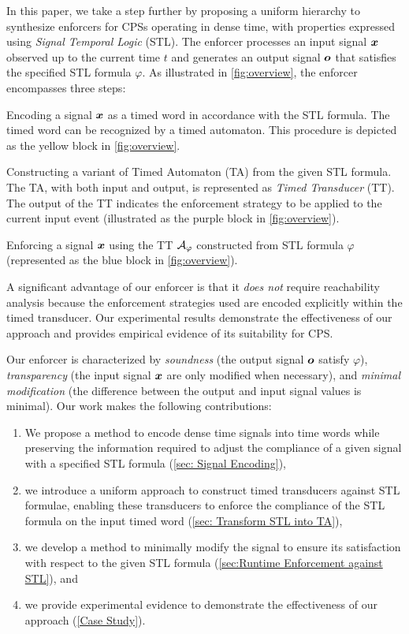 In this paper, we take a step further by proposing a uniform hierarchy to synthesize enforcers for CPSs operating in dense time, with properties expressed using \emph{Signal Temporal Logic} (STL). The enforcer processes an input signal $\bm{x}$ observed up to the current time $t$ and generates an output signal $\bm{o}$ that satisfies the specified STL formula $\varphi$. As illustrated in \cref{fig:overview}, the enforcer encompasses three steps:
\begin{enumerate*}[label=(\roman*)]
\item Encoding a signal $\bm{x}$ as a timed word in accordance with the STL formula. The timed word can be recognized by a timed automaton. This procedure is depicted as the yellow block in \cref{fig:overview}.
\item Constructing a variant of Timed Automaton (TA) from the given STL formula. The TA, with both input and output, is represented as \emph{Timed Transducer} (TT). The output of the TT indicates the enforcement strategy to be applied to the current input event (illustrated as the purple block in \cref{fig:overview}).
\item Enforcing a signal $\bm{x}$ using the TT $\mathcal{A}_\varphi$ constructed from STL formula $\varphi$ (represented as the blue block in \cref{fig:overview}).
\end{enumerate*}
A significant advantage of our enforcer is that it \emph{does not} require reachability analysis because the enforcement strategies used are encoded explicitly within the timed transducer. Our experimental results demonstrate the effectiveness of our approach and provides empirical evidence of its suitability for CPS.

Our enforcer is characterized by \emph{soundness} (the output signal $\bm{o}$ satisfy $\varphi$), \emph{transparency} (the input signal $\bm{x}$ are only modified when necessary), and \emph{minimal modification} (the difference between the output and input signal values is minimal). Our work makes the following contributions:
\begin{enumerate}
    \item We propose a method to encode dense time signals into time words while preserving the information required to adjust the compliance of a given signal with a specified STL formula (\cref{sec: Signal Encoding}),
    \item we introduce a uniform approach to construct timed transducers against STL formulae, enabling these transducers to enforce the compliance of the STL formula on the input timed word (\cref{sec: Transform STL into TA}),
    \item we develop a method to minimally modify the signal to ensure its satisfaction with respect to the given STL formula (\cref{sec:Runtime Enforcement against STL}), and
    \item we provide experimental evidence to demonstrate the effectiveness of our approach (\cref{Case Study}).
\end{enumerate}

